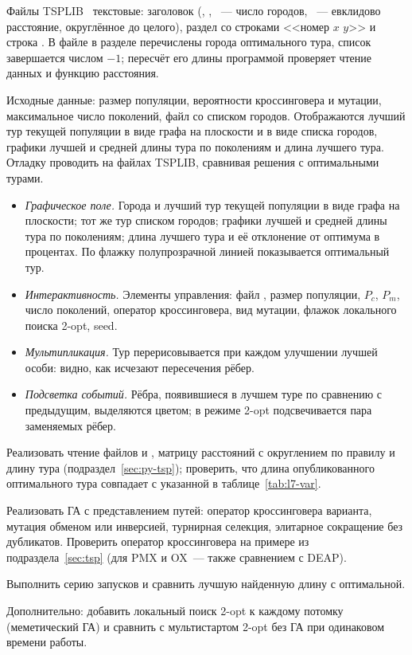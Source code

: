 Файлы TSPLIB~\cite{reinelt1991} текстовые: заголовок (, , ~---
число городов, ~--- евклидово расстояние, округлённое до целого),
раздел  со строками <<номер $x$ $y$>> и строка . В файле
 в разделе  перечислены города оптимального тура, список
завершается числом $-1$; пересчёт его длины программой проверяет чтение данных и функцию расстояния.

Исходные данные: размер популяции, вероятности кроссинговера и мутации, максимальное число поколений,
файл  со списком городов. Отображаются лучший тур текущей популяции в виде графа на
плоскости и в виде списка городов, графики лучшей и средней длины тура по поколениям и длина лучшего
тура. Отладку проводить на файлах TSPLIB, сравнивая решения с оптимальными
турами.

\begin{itemize}
\item \emph{Графическое поле.} Города и лучший тур текущей популяции в виде графа на плоскости; тот же тур списком городов; графики лучшей и средней длины тура по поколениям; длина лучшего тура и её отклонение от оптимума в процентах. По флажку полупрозрачной линией показывается оптимальный тур.
\item \emph{Интерактивность.} Элементы управления: файл , размер популяции, $P_c$, $P_m$, число поколений, оператор кроссинговера, вид мутации, флажок локального поиска 2-opt, seed.
\item \emph{Мультипликация.} Тур перерисовывается при каждом улучшении лучшей особи: видно, как исчезают пересечения рёбер.
\item \emph{Подсветка событий.} Рёбра, появившиеся в лучшем туре по сравнению с предыдущим, выделяются цветом; в режиме 2-opt подсвечивается пара заменяемых рёбер.
\end{itemize}

\begin{steps}
\item Реализовать чтение файлов  и , матрицу расстояний с
округлением по правилу  и длину тура (подраздел~\ref{sec:py-tsp}); проверить, что длина опубликованного оптимального тура
совпадает с указанной в таблице~\ref{tab:l7-var}.
\item Реализовать ГА с представлением путей: оператор кроссинговера варианта, мутация обменом или
инверсией, турнирная селекция, элитарное сокращение без дубликатов. Проверить оператор кроссинговера на
примере из подраздела~\ref{sec:tsp} (для PMX и OX~--- также сравнением с DEAP).
\item Выполнить серию запусков и сравнить лучшую найденную длину с оптимальной.
\item Дополнительно: добавить локальный поиск 2-opt к каждому потомку (меметический ГА) и сравнить с
мультистартом 2-opt без ГА при одинаковом времени работы.
\end{steps}

